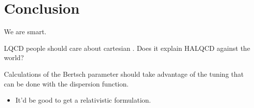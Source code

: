 \section{Conclusion}\label{sec:conclusion}

We are smart.

LQCD people should care about cartesian \Luscher.  Does it explain HALQCD against the world?

Calculations of the Bertsch parameter should take advantage of the tuning that can be done with the dispersion function.

\begin{itemize}
    \item It'd be good to get a relativistic formulation.
\end{itemize}
